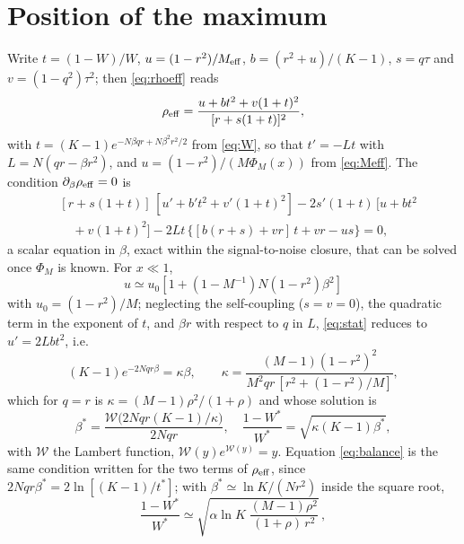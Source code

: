 \documentclass[11pt,a4paper]{article}
\newcommand{\Meff}{M_{\rm eff}}
\begin{document}
\section{Position of the maximum}
Write $t=(1-W)/W$, $u=(1-r^2)/\Meff$, $b=(r^2+u)/(K-1)$, $s=q\tau$ and $v=(1-q^2)\tau^2$; then \eqref{eq:rhoeff} reads
\begin{equation*}
\rho_{\rm eff}=\frac{u+bt^2+v(1+t)^2}{[r+s(1+t)]^2},
\end{equation*}
with $t=(K-1)e^{-N\beta qr+N\beta^2r^2/2}$ from \eqref{eq:W}, so that $t'=-Lt$ with $L=N(qr-\beta r^2)$, and $u=(1-r^2)/(M\Phi_M(x))$ from \eqref{eq:Meff}. The condition $\partial_\beta\rho_{\rm eff}=0$ is
\begin{align}
&[r+s(1+t)]\,[u'+b't^2+v'(1+t)^2]-2s'(1+t)\,[u+bt^2\nonumber\\
&\quad+v(1+t)^2]-2Lt\,\{[b(r+s)+vr]\,t+vr-us\}=0,
\label{eq:stat}
\end{align}
a scalar equation in $\beta$, exact within the signal-to-noise closure, that can be solved once $\Phi_M$ is known. For $x\ll1$,
\begin{equation*}
u\simeq u_0[1+(1-M^{-1})N(1-r^2)\beta^2]
\end{equation*}
with $u_0=(1-r^2)/M$; neglecting the self-coupling ($s=v=0$), the quadratic term in the exponent of $t$, and $\beta r$ with respect to $q$ in $L$, \eqref{eq:stat} reduces to $u'=2Lbt^2$, i.e.
\begin{equation}
(K-1)e^{-2Nqr\beta}=\kappa\beta,\qquad \kappa=\frac{(M-1)(1-r^2)^2}{M^2qr\,[r^2+(1-r^2)/M]},
\end{equation}
which for $q=r$ is $\kappa=(M-1)\rho^2/(1+\rho)$ and whose solution is
\begin{equation}
\beta^*=\frac{\mathcal W\big(2Nqr(K-1)/\kappa\big)}{2Nqr},\quad \frac{1-W^*}{W^*}=\sqrt{\kappa(K-1)\beta^*},
\label{eq:betastar}
\end{equation}
with $\mathcal W$ the Lambert function, $\mathcal W(y)e^{\mathcal W(y)}=y$. Equation \eqref{eq:balance} is the same condition written for the two terms of $\rho_{\rm eff}$, since $2Nqr\beta^*=2\ln[(K-1)/t^*]$; with $\beta^*\simeq\ln K/(Nr^2)$ inside the square root,
\begin{equation*}
\frac{1-W^*}{W^*}\simeq\sqrt{\alpha\ln K\;\frac{(M-1)\rho^2}{(1+\rho)\,r^2}}\,,
\end{equation*}
\end{document}
